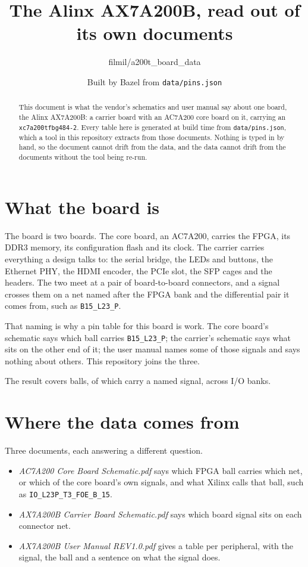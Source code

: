 \documentclass[10pt,a4paper]{article}
\title{The Alinx AX7A200B, read out of its own documents}
\author{filmil/a200t\_board\_data}
\date{Built by Bazel from \texttt{data/pins.json}}
\begin{document}
\maketitle

\begin{abstract}
This document is what the vendor's schematics and user manual say about
one board, the Alinx AX7A200B: a carrier board with an AC7A200 core
board on it, carrying an \texttt{xc7a200tfbg484-2}. Every table here is
generated at build time from \texttt{data/pins.json}, which a tool in
this repository extracts from those documents. Nothing is typed in by
hand, so the document cannot drift from the data, and the data cannot
drift from the documents without the tool being re-run.
\end{abstract}

\section{What the board is}

The board is two boards. The core board, an AC7A200, carries the FPGA,
its DDR3 memory, its configuration flash and its clock. The carrier
carries everything a design talks to: the serial bridge, the LEDs and
buttons, the Ethernet PHY, the HDMI encoder, the PCIe slot, the SFP
cages and the headers. The two meet at a pair of board-to-board
connectors, and a signal crosses them on a net named after the FPGA bank
and the differential pair it comes from, such as \texttt{B15\_L23\_P}.

That naming is why a pin table for this board is work. The core board's
schematic says which ball carries \texttt{B15\_L23\_P}; the carrier's
schematic says what sits on the other end of it; the user manual names
some of those signals and says nothing about others. This repository
joins the three.

The result covers \ballcount{} balls, \namedcount{} of which carry a
named signal, across \bankcount{} I/O banks.

\section{Where the data comes from}

Three documents, each answering a different question.

\begin{itemize}
  \item \emph{AC7A200 Core Board Schematic.pdf} says which FPGA ball
    carries which net, or which of the core board's own signals, and
    what Xilinx calls that ball, such as
    \texttt{IO\_L23P\_T3\_FOE\_B\_15}.
  \item \emph{AX7A200B Carrier Board Schematic.pdf} says which board
    signal sits on each connector net.
  \item \emph{AX7A200B User Manual REV1.0.pdf} gives a table per
    peripheral, with the signal, the ball and a sentence on what the
    signal does.
\end{itemize}
\end{document}
